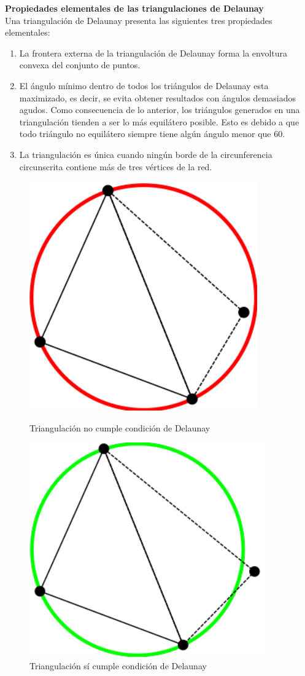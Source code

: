 \documentclass[12pt]{report}
\begin{document}
		{\large{\textbf{Propiedades elementales de las triangulaciones de Delaunay}}}\\

	Una triangulación de Delaunay presenta las siguientes tres propiedades elementales:
	
	\begin{enumerate}
		\item La frontera externa de la triangulación de Delaunay forma la envoltura convexa del conjunto de puntos.
		\item El ángulo mínimo dentro de todos los triángulos de Delaunay esta maximizado, es decir, se evita obtener resultados con ángulos demasiados agudos. Como consecuencia de lo anterior, los triángulos generados en una triangulación tienden a ser lo más equilátero posible. Esto  es debido a que todo triángulo no equilátero siempre tiene algún ángulo menor que 60{\degree }.
		\item La triangulación es única cuando ningún borde de la circunferencia circunscrita contiene más de tres vértices de la red. 
	
	\end{enumerate}
		

	
	\begin{figure}[h]
		\centering
		\begin{minipage}{0.45\textwidth}
			\centering
			\includegraphics[width=0.44\linewidth]{no_td.png}  %
			\caption{Triangulación no cumple condición de Delaunay}
			\label{no_cumple}
			
		\end{minipage}\hfill
		\begin{minipage}{0.45\textwidth}
			\centering
			\includegraphics[width=0.5\linewidth]{si_td.png}  %
			\caption{Triangulación sí cumple condición de Delaunay}
			\label{cumple}
		\end{minipage}
	\end{figure}
\end{document}
